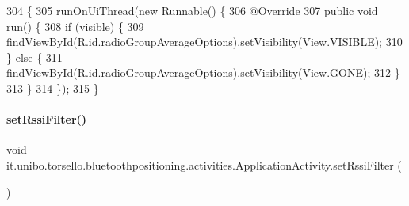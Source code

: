 \begin{DoxyCode}
304                                                              \{
305         runOnUiThread(\textcolor{keyword}{new} Runnable() \{
306             @Override
307             \textcolor{keyword}{public} \textcolor{keywordtype}{void} run() \{
308                 \textcolor{keywordflow}{if} (visible) \{
309                     findViewById(R.id.radioGroupAverageOptions).setVisibility(View.VISIBLE);
310                 \} \textcolor{keywordflow}{else} \{
311                     findViewById(R.id.radioGroupAverageOptions).setVisibility(View.GONE);
312                 \}
313             \}
314         \});
315     \}
\end{DoxyCode}
\hypertarget{classit_1_1unibo_1_1torsello_1_1bluetoothpositioning_1_1activities_1_1ApplicationActivity_a8b2514096adfe574c15cc5317a45cd58_a8b2514096adfe574c15cc5317a45cd58}{}\label{classit_1_1unibo_1_1torsello_1_1bluetoothpositioning_1_1activities_1_1ApplicationActivity_a8b2514096adfe574c15cc5317a45cd58_a8b2514096adfe574c15cc5317a45cd58} 
\paragraph{\texorpdfstring{set\+Rssi\+Filter()}{setRssiFilter()}}
{\footnotesize\ttfamily void it.\+unibo.\+torsello.\+bluetoothpositioning.\+activities.\+Application\+Activity.\+set\+Rssi\+Filter (\begin{DoxyParamCaption}{ }\end{DoxyParamCaption})\hspace{0.3cm}{\ttfamily [private]}}


